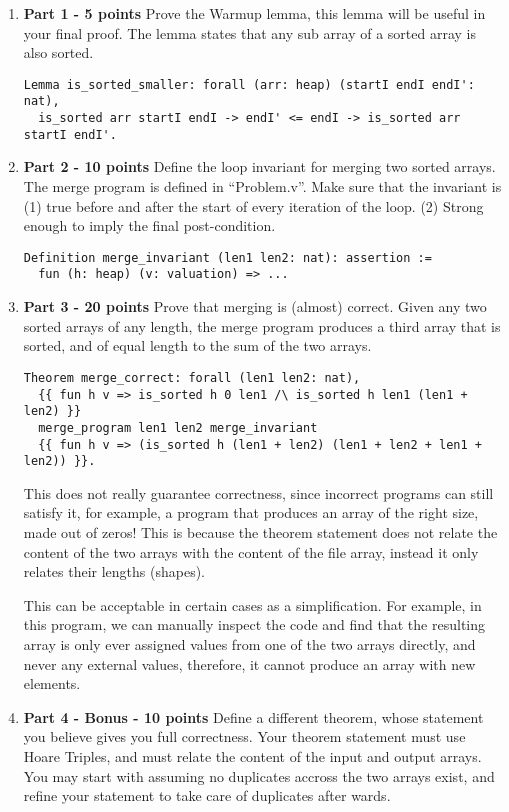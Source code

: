 \documentclass{article}
\begin{document}
\begin{enumerate}
\item \textbf{Part 1 - 5 points} Prove the Warmup lemma, this lemma will be useful in your final proof. The lemma states
that any sub array of a sorted array is also sorted.
\begin{verbatim}
Lemma is_sorted_smaller: forall (arr: heap) (startI endI endI': nat),
  is_sorted arr startI endI -> endI' <= endI -> is_sorted arr startI endI'.
\end{verbatim}

\item \textbf{Part 2 - 10 points} Define the loop invariant for merging two sorted arrays. The merge program is defined in ``Problem.v''.
Make sure that the invariant is (1) true before and after the start of every iteration of the loop. (2) Strong enough to imply the final post-condition.
\begin{verbatim}
Definition merge_invariant (len1 len2: nat): assertion :=
  fun (h: heap) (v: valuation) => ...
\end{verbatim}

\item \textbf{Part 3 - 20 points} Prove that merging is (almost) correct. Given any two sorted arrays of any length, the merge program produces a third array
that is sorted, and of equal length to the sum of the two arrays.
\begin{verbatim}
Theorem merge_correct: forall (len1 len2: nat),
  {{ fun h v => is_sorted h 0 len1 /\ is_sorted h len1 (len1 + len2) }}
  merge_program len1 len2 merge_invariant
  {{ fun h v => (is_sorted h (len1 + len2) (len1 + len2 + len1 + len2)) }}.
\end{verbatim}

This does not really guarantee correctness, since incorrect programs can still satisfy it, for example, a program that produces an array of the right size, made out
of zeros! This is because the theorem statement does not relate the content of the two arrays with the content of the file array, instead it only relates their
lengths (shapes).

This can be acceptable in certain cases as a simplification. For example, in this program, we can manually inspect the code and find that the resulting array is only
ever assigned values from one of the two arrays directly, and never any external values, therefore, it cannot produce an array with new elements.

\item \textbf{Part 4 - Bonus - 10 points} Define a different theorem, whose statement you believe gives you full correctness. Your theorem statement
must use Hoare Triples, and must relate the content of the input and output arrays. You may start with assuming no duplicates accross the two arrays
exist, and refine your statement to take care of duplicates after wards.


\end{enumerate}
\end{document}
